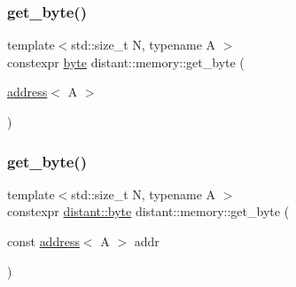 \subsubsection{\texorpdfstring{get\+\_\+byte()}{get\_byte()}\hspace{0.1cm}{\footnotesize\ttfamily [1/2]}}
{\footnotesize\ttfamily template$<$std\+::size\+\_\+t N, typename A $>$ \\
constexpr \mbox{\hyperlink{namespacedistant_af9c3f04a9b855a1368d6c1a9ce28c2f4}{byte}} distant\+::memory\+::get\+\_\+byte (\begin{DoxyParamCaption}\item[{\mbox{\hyperlink{classdistant_1_1memory_1_1address}{address}}$<$ A $>$}]{ }\end{DoxyParamCaption})\hspace{0.3cm}{\ttfamily [noexcept]}}

\mbox{\label{namespacedistant_1_1memory_a3febd1915bbec9ab10979f06dae9ffd9}} 
\subsubsection{\texorpdfstring{get\+\_\+byte()}{get\_byte()}\hspace{0.1cm}{\footnotesize\ttfamily [2/2]}}
{\footnotesize\ttfamily template$<$std\+::size\+\_\+t N, typename A $>$ \\
constexpr \mbox{\hyperlink{namespacedistant_af9c3f04a9b855a1368d6c1a9ce28c2f4}{distant\+::byte}} distant\+::memory\+::get\+\_\+byte (\begin{DoxyParamCaption}\item[{const \mbox{\hyperlink{classdistant_1_1memory_1_1address}{address}}$<$ A $>$}]{addr }\end{DoxyParamCaption})\hspace{0.3cm}{\ttfamily [noexcept]}}

\mbox{\label{namespacedistant_1_1memory_a6021f7cb185a7211fdfd784beb072cce}} 
